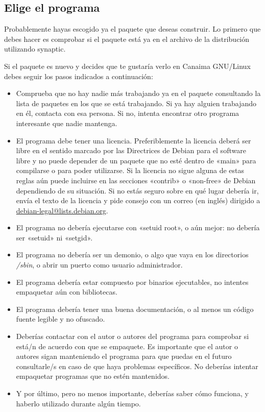 \documentclass[letterpaper,12pt,spanish]{manual}
\begin{document}
\subsection{Elige el programa}

Probablemente hayas escogido ya el paquete que deseas construir. Lo primero que debes hacer es comprobar si el paquete está ya en el archivo de la distribución utilizando synaptic.

Si el paquete es nuevo y decides que te gustaría verlo en Canaima GNU/Linux debes seguir los pasos indicados a continuación:
\begin{itemize}
\item {} 
Comprueba que no hay nadie más trabajando ya en el paquete consultando la lista de paquetes en los que se está trabajando. Si ya hay alguien trabajando en él, contacta con esa persona. Si no, intenta encontrar otro programa interesante que nadie mantenga.

\item {} 
El programa debe tener una licencia. Preferiblemente la licencia deberá ser libre en el sentido marcado por las Directrices de Debian para el software libre y no puede depender de un paquete que no esté dentro de «main» para compilarse o para poder utilizarse. Si la licencia no sigue alguna de estas reglas aún puede incluirse en las secciones «contrib» o «non-free» de Debian dependiendo de su situación. Si no estás seguro sobre en qué lugar debería ir, envía el texto de la licencia y pide consejo con un correo (en inglés) dirigido a \href{mailto:debian-legal@lists.debian.org}{debian-legal@lists.debian.org}.

\item {} 
El programa no debería ejecutarse con «setuid root», o aún mejor: no debería ser «setuid» ni «setgid».

\item {} 
El programa no debería ser un demonio, o algo que vaya en los directorios \emph{/sbin}, o abrir un puerto como usuario administrador.

\item {} 
El programa debería estar compuesto por binarios ejecutables, no intentes empaquetar aún con bibliotecas.

\item {} 
El programa debería tener una buena documentación, o al menos un código fuente legible y no ofuscado.

\item {} 
Deberías contactar con el autor o autores del programa para comprobar si está/n de acuerdo con que se empaquete. Es importante que el autor o autores sigan manteniendo el programa para que puedas en el futuro consultarle/s en caso de que haya problemas específicos. No deberías intentar empaquetar programas que no estén mantenidos.

\item {} 
Y por último, pero no menos importante, deberías saber cómo funciona, y haberlo utilizado durante algún tiempo.

\end{itemize}
\end{document}
